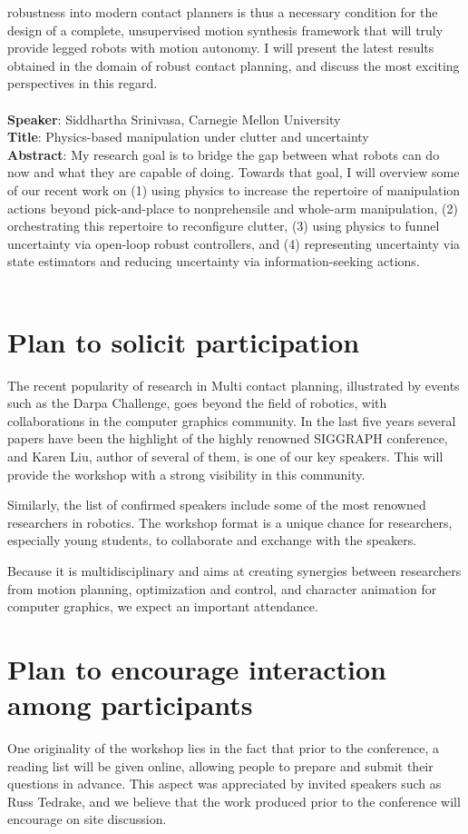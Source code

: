 \documentclass[conference]{IEEEtran}
\begin{document}
robustness into modern contact planners is thus a necessary condition for the design of a complete, unsupervised
motion synthesis framework that will truly provide legged robots with motion autonomy. I will
present the latest results obtained in the domain of robust contact planning, and discuss the most exciting perspectives
in this regard.\\ \\
\textbf{Speaker}: Siddhartha Srinivasa, Carnegie Mellon University \\ 
\textbf{Title}: Physics-based manipulation under clutter and uncertainty \\
\textbf{Abstract}: My research goal is to bridge the gap between what robots can do now and what they are capable of doing. Towards that goal, I will overview some of our recent work on (1) using physics to increase the repertoire of manipulation actions beyond pick-and-place to nonprehensile and whole-arm manipulation, (2) orchestrating this repertoire to reconfigure clutter, (3) using physics to funnel uncertainty via open-loop robust controllers, and (4) representing uncertainty via state estimators and reducing uncertainty via information-seeking actions. \\ \\

\section{Plan to solicit participation}
The recent popularity of research in Multi contact planning, illustrated by events such as the Darpa Challenge, goes beyond the field of robotics, with collaborations in the computer graphics community. In the last five years several papers have been the highlight of the highly renowned SIGGRAPH conference, and Karen Liu, author of several of them, is one of our key speakers. This will provide the workshop with a strong visibility in this community.

Similarly, the list of confirmed speakers include some of the most renowned researchers in robotics.
The workshop format is a unique chance for researchers, especially young students, to collaborate and exchange with the speakers.

Because it is multidisciplinary and aims at creating synergies between researchers from motion planning, optimization and control, and character animation for computer graphics, we expect an important attendance.

\section{Plan to encourage interaction among participants}
One originality of the workshop lies in the fact that prior to the conference, a reading list will be given online, allowing people to prepare and submit their questions in advance. This aspect was appreciated by invited speakers such as Russ Tedrake, and we believe that the work produced prior to the conference will encourage on site discussion.
\end{document}
